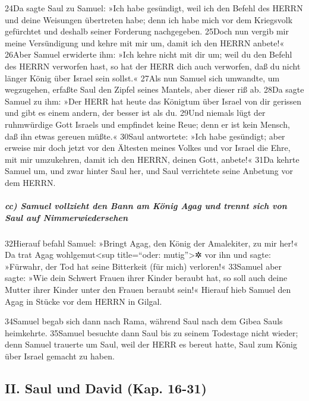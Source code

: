 24Da sagte Saul zu Samuel: »Ich habe gesündigt, weil ich den Befehl des
HERRN und deine Weisungen übertreten habe; denn ich habe mich vor dem
Kriegsvolk gefürchtet und deshalb seiner Forderung nachgegeben. 25Doch
nun vergib mir meine Versündigung und kehre mit mir um, damit ich den
HERRN anbete!« 26Aber Samuel erwiderte ihm: »Ich kehre nicht mit dir um;
weil du den Befehl des HERRN verworfen hast, so hat der HERR dich auch
verworfen, daß du nicht länger König über Israel sein sollst.« 27Als nun
Samuel sich umwandte, um wegzugehen, erfaßte Saul den Zipfel seines
Mantels, aber dieser riß ab. 28Da sagte Samuel zu ihm: »Der HERR hat
heute das Königtum über Israel von dir gerissen und gibt es einem
andern, der besser ist als du. 29Und niemals lügt der ruhmwürdige Gott
Israels und empfindet keine Reue; denn er ist kein Mensch, daß ihn etwas
gereuen müßte.« 30Saul antwortete: »Ich habe gesündigt; aber erweise mir
doch jetzt vor den Ältesten meines Volkes und vor Israel die Ehre, mit
mir umzukehren, damit ich den HERRN, deinen Gott, anbete!« 31Da kehrte
Samuel um, und zwar hinter Saul her, und Saul verrichtete seine Anbetung
vor dem HERRN.

\hypertarget{cc-samuel-vollzieht-den-bann-am-kuxf6nig-agag-und-trennt-sich-von-saul-auf-nimmerwiedersehen}{%
\subparagraph{cc) Samuel vollzieht den Bann am König Agag und trennt
sich von Saul auf
Nimmerwiedersehen}\label{cc-samuel-vollzieht-den-bann-am-kuxf6nig-agag-und-trennt-sich-von-saul-auf-nimmerwiedersehen}}

32Hierauf befahl Samuel: »Bringt Agag, den König der Amalekiter, zu mir
her!« Da trat Agag wohlgemut\textless sup title=``oder:
mutig''\textgreater✲ vor ihn und sagte: »Fürwahr, der Tod hat seine
Bitterkeit (für mich) verloren!« 33Samuel aber sagte: »Wie dein Schwert
Frauen ihrer Kinder beraubt hat, so soll auch deine Mutter ihrer Kinder
unter den Frauen beraubt sein!« Hierauf hieb Samuel den Agag in Stücke
vor dem HERRN in Gilgal.

34Samuel begab sich dann nach Rama, während Saul nach dem Gibea Sauls
heimkehrte. 35Samuel besuchte dann Saul bis zu seinem Todestage nicht
wieder; denn Samuel trauerte um Saul, weil der HERR es bereut hatte,
Saul zum König über Israel gemacht zu haben.

\hypertarget{ii.-saul-und-david-kap.-16-31}{%
\subsection{II. Saul und David (Kap.
16-31)}\label{ii.-saul-und-david-kap.-16-31}}

